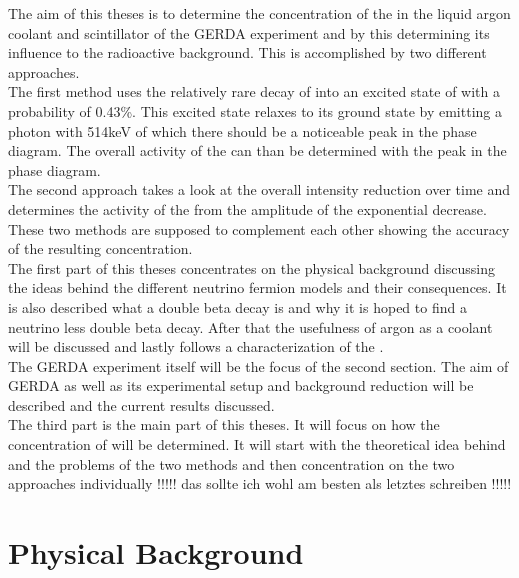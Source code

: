 The aim of this theses is to determine the concentration of the  in the liquid argon coolant and scintillator of the GERDA experiment and by this determining its influence to the radioactive background. 
This is accomplished by two different approaches. 
\\

The first method uses the relatively rare decay of  into an excited state of  with a probability of 0.43\%. 
This excited state relaxes to its ground state by emitting a photon with 514keV of which there should be a noticeable peak in the phase diagram. 
The overall activity of the  can than be determined with the peak in the phase diagram. 
\\

The second approach takes a look at the overall intensity reduction over time and determines the activity of the  from the amplitude of the exponential decrease. 
These two methods are supposed to complement each other showing the accuracy of the resulting concentration.\\

The first part of this theses concentrates on the physical background discussing the ideas behind the different neutrino fermion models and their consequences. 
It is also described what a double beta decay is and why it is hoped to find a neutrino less double beta decay. 
After that the usefulness of argon as a coolant will be discussed and lastly follows a characterization of the .\\

The GERDA experiment itself will be the focus of the second section. 
The aim of GERDA as well as its experimental setup and background reduction will be described and the current results discussed.\\

The third part is the main part of this theses. 
It will focus on how the concentration of  will be determined. 
It will start with the theoretical idea behind and the problems of the two methods and then concentration on the two approaches individually !!!!! das sollte ich wohl am besten als letztes schreiben !!!!!


\section{Physical Background}
\label{sec:PhyBG}

